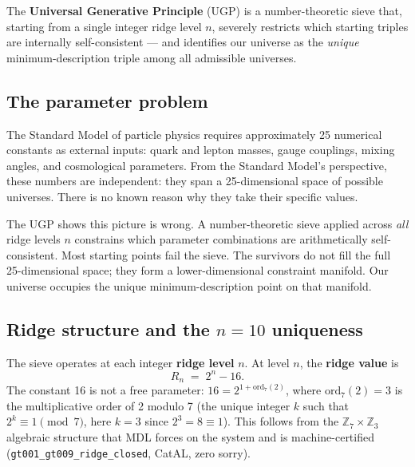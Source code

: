 \documentclass[11pt,a4paper]{article}
\newcommand{\term}[1]{\textbf{#1}}
\newcommand{\lean}[1]{\texttt{#1}}
\newcommand{\CatAL}{\textsf{CatAL}}
\begin{document}
\begin{tcolorbox}[colback=boxblue,colframe=blue!40!black,title=The one-line answer]
The \term{Universal Generative Principle} (UGP) is a number-theoretic sieve that,
starting from a single integer ridge level $n$, severely restricts which starting
triples are internally self-consistent --- and identifies our universe as the
\emph{unique} minimum-description triple among all admissible universes.
\end{tcolorbox}

\subsection{The parameter problem}

The Standard Model of particle physics requires approximately 25 numerical constants
as external inputs: quark and lepton masses, gauge couplings, mixing angles, and
cosmological parameters.  From the Standard Model's perspective, these numbers are
independent: they span a 25-dimensional space of possible universes.  There is no
known reason why they take their specific values.

The UGP shows this picture is wrong.  A number-theoretic sieve applied across
\emph{all} ridge levels $n$ constrains which parameter combinations are
arithmetically self-consistent.  Most starting points fail the sieve.  The survivors
do not fill the full 25-dimensional space; they form a lower-dimensional constraint
manifold.  Our universe occupies the unique minimum-description point on that manifold.

\subsection{Ridge structure and the $n = 10$ uniqueness}

The sieve operates at each integer \term{ridge level} $n$.  At level $n$, the
\term{ridge value} is
\[
  R_n \;=\; 2^n - 16.
\]
The constant 16 is not a free parameter: $16 = 2^{1+\mathrm{ord}_7(2)}$, where
$\mathrm{ord}_7(2) = 3$ is the multiplicative order of 2 modulo 7 (the unique
integer $k$ such that $2^k \equiv 1 \pmod 7$, here $k = 3$ since $2^3 = 8 \equiv 1$).
This follows from the $\mathbb{Z}_7 \times \mathbb{Z}_3$ algebraic structure
that MDL forces on the system and is machine-certified
(\lean{gt001\_gt009\_ridge\_closed}, \CatAL, zero sorry).
\end{document}

